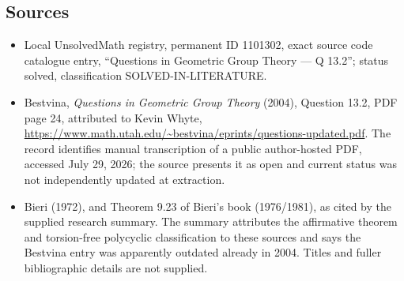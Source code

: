 \documentclass[11pt]{article}
\begin{document}
\subsection{Sources}
\begin{itemize}
\item Local UnsolvedMath registry, permanent ID 1101302, exact source code catalogue entry, ``Questions in Geometric Group Theory --- Q 13.2''; status solved, classification SOLVED-IN-LITERATURE.
\item Bestvina, \emph{Questions in Geometric Group Theory} (2004), Question 13.2, PDF page 24, attributed to Kevin Whyte, \url{https://www.math.utah.edu/~bestvina/eprints/questions-updated.pdf}. The record identifies manual transcription of a public author-hosted PDF, accessed July 29, 2026; the source presents it as open and current status was not independently updated at extraction.
\item Bieri (1972), and Theorem 9.23 of Bieri's book (1976/1981), as cited by the supplied research summary. The summary attributes the affirmative theorem and torsion-free polycyclic classification to these sources and says the Bestvina entry was apparently outdated already in 2004. Titles and fuller bibliographic details are not supplied.
\end{itemize}
\end{document}
